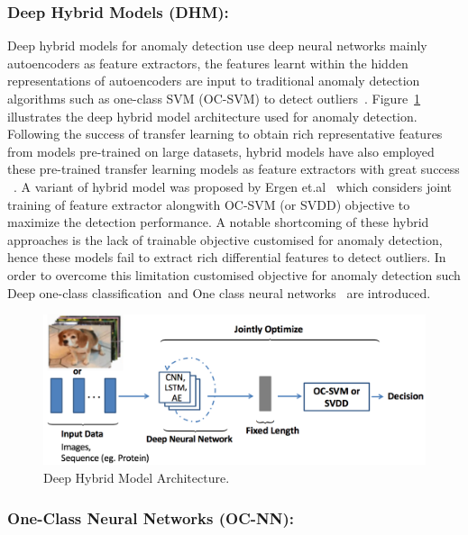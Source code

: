 \subsubsection{Deep Hybrid Models (DHM):}
\label{sec:DHM}

Deep hybrid models for anomaly detection use deep neural networks mainly autoencoders as feature extractors, the features learnt within the hidden representations of autoencoders are input to traditional anomaly detection algorithms such as one-class SVM (OC-SVM) to detect outliers~\cite{andrews2016detecting}. Figure~\ref{fig:HybridDeepModels} illustrates  the deep hybrid model architecture used for anomaly detection. Following the success of transfer learning to obtain rich representative features  from models pre-trained on large datasets,  hybrid models have also employed these pre-trained transfer learning models as feature extractors with great success ~\cite{pan2010survey}. A variant of hybrid model was proposed by  Ergen et.al~\cite{ergen2017unsupervised} which considers joint training of feature extractor alongwith OC-SVM (or SVDD) objective to maximize the detection performance. A notable shortcoming of these hybrid approaches
is the lack of trainable objective customised for anomaly detection, hence these models fail to extract rich differential features to detect outliers.  In order to overcome this limitation customised objective for anomaly detection such Deep one-class classification~\cite{ruff2018deep}and  One class neural networks~\cite{chalapathy2018anomaly} are introduced.

\begin{figure}
\includegraphics[scale=0.5]{images/HybridDeepModels}
\captionsetup{justification=centering}
\caption{Deep Hybrid Model Architecture.}
\label{fig:HybridDeepModels}
\end{figure}

\subsubsection{One-Class Neural Networks (OC-NN):}
\label{sec:oc-nn}

